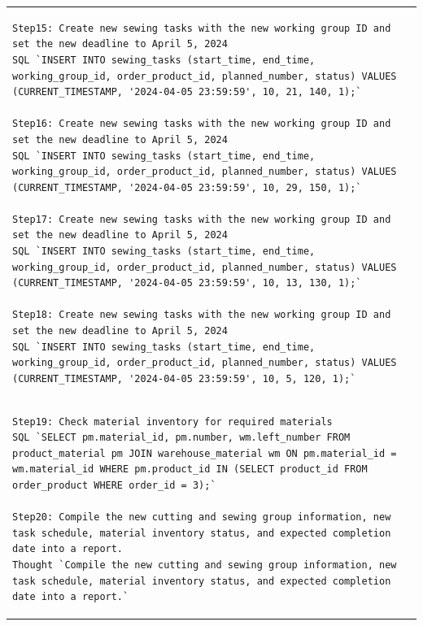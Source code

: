 \documentclass[preprint,12pt]{elsarticle}
\begin{document}
\begin{center}
\begin{longtable}{p{390pt}}
\begin{lstlisting}[style=my_operation, label={lst:chain_of_operation}]
Step15: Create new sewing tasks with the new working group ID and set the new deadline to April 5, 2024
SQL `INSERT INTO sewing_tasks (start_time, end_time, working_group_id, order_product_id, planned_number, status) VALUES (CURRENT_TIMESTAMP, '2024-04-05 23:59:59', 10, 21, 140, 1);`

Step16: Create new sewing tasks with the new working group ID and set the new deadline to April 5, 2024
SQL `INSERT INTO sewing_tasks (start_time, end_time, working_group_id, order_product_id, planned_number, status) VALUES (CURRENT_TIMESTAMP, '2024-04-05 23:59:59', 10, 29, 150, 1);`

Step17: Create new sewing tasks with the new working group ID and set the new deadline to April 5, 2024
SQL `INSERT INTO sewing_tasks (start_time, end_time, working_group_id, order_product_id, planned_number, status) VALUES (CURRENT_TIMESTAMP, '2024-04-05 23:59:59', 10, 13, 130, 1);`

Step18: Create new sewing tasks with the new working group ID and set the new deadline to April 5, 2024
SQL `INSERT INTO sewing_tasks (start_time, end_time, working_group_id, order_product_id, planned_number, status) VALUES (CURRENT_TIMESTAMP, '2024-04-05 23:59:59', 10, 5, 120, 1);`

\end{lstlisting}\\ 
\begin{lstlisting}[style=my_operation, label={lst:chain_of_operation}]
Step19: Check material inventory for required materials
SQL `SELECT pm.material_id, pm.number, wm.left_number FROM product_material pm JOIN warehouse_material wm ON pm.material_id = wm.material_id WHERE pm.product_id IN (SELECT product_id FROM order_product WHERE order_id = 3);`

Step20: Compile the new cutting and sewing group information, new task schedule, material inventory status, and expected completion date into a report.
Thought `Compile the new cutting and sewing group information, new task schedule, material inventory status, and expected completion date into a report.`
\end{lstlisting}\\ \hline
\end{longtable}
\end{center}









\end{document}
